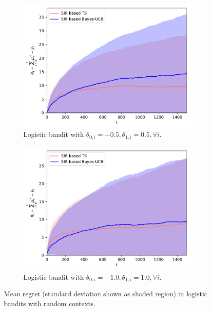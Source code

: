 \documentclass{article}
\begin{document}
\begin{figure}[!ht]
	\centering
	\begin{subfigure}[b]{0.49\textwidth}
		\includegraphics[width=\textwidth]{./figs/static/logistic/cumulative_regret_theta_05}
		\caption{Logistic bandit with $\theta_{0,i}=-0.5, \theta_{1,i}=0.5, \forall i$.}
		\label{fig:static_bandits_logistic_05}
	\end{subfigure}
	\begin{subfigure}[b]{0.49\textwidth}
		\includegraphics[width=\textwidth]{./figs/static/logistic/cumulative_regret_theta_1}
		\caption{Logistic bandit with $\theta_{0,i}=-1.0, \theta_{1,i}=1.0, \forall i$.}
		\label{fig:static_bandits_logistic_1}
	\end{subfigure}
	\caption{Mean regret (standard deviation shown as shaded region) in logistic bandits with random contexts.}
	\label{fig:static_bandits_logistic}
\end{figure}
\end{document}
